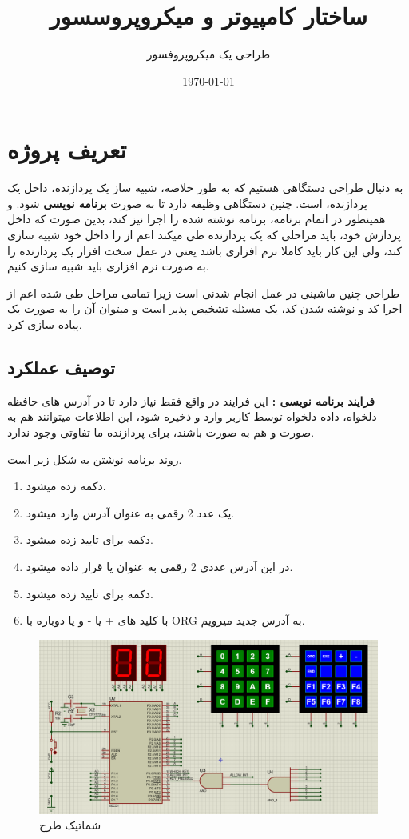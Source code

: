 \documentclass[11pt]{article}
\title{ساختار کامپیوتر و میکروپروسسور}
\subtitle{طراحی یک میکروپروفسور}
\date{\today}
\begin{document}
\maketitlepage
\maketitlestart

\section{تعریف پروژه}

به دنبال طراحی دستگاهی هستیم که به طور خلاصه، شبیه ساز یک
پردازنده، داخل یک پردازنده، است. چنین دستگاهی وظیفه دارد تا
به صورت  \textbf{برنامه نویسی} شود. و همینطور در
اتمام برنامه، برنامه نوشته شده را اجرا نیز کند، بدین صورت که داخل
پردازش خود، باید مراحلی که یک پردازنده طی میکند اعم از
 را داخل خود شبیه سازی کند، ولی این
کار باید کاملا نرم افزاری باشد یعنی در عمل سخت افزار یک پردازنده را
به صورت نرم افزاری باید شبیه سازی کنیم.

طراحی چنین ماشینی در عمل انجام شدنی است زیرا تمامی مراحل طی شده
اعم از اجرا کد و نوشته شدن کد، یک مسئله تشخیص پذیر است و میتوان آن را
به صورت یک  پیاده سازی کرد.

\subsection{توصیف عملکرد}

\textbf{فرایند برنامه نویسی : }
این فرایند در واقع فقط نیاز دارد تا در آدرس های حافظه دلخواه، داده دلخواه توسط کاربر وارد
و ذخیره شود، این اطلاعات میتوانند هم به صورت  و هم به صورت  باشند،
برای پردازنده ما تفاوتی وجود ندارد.

روند برنامه نوشتن به شکل زیر است.

\begin{enumerate}
	\item دکمه  زده میشود.
	\item یک عدد 2 رقمی به عنوان آدرس وارد میشود.
	\item دکمه  برای تایید زده میشود.
	\item در این آدرس عددی 2 رقمی به عنوان  یا  قرار داده میشود.
	\item دکمه  برای تایید زده میشود.
	\item با کلید های + یا - و یا دوباره با ORG به آدرس جدید میرویم.
\end{enumerate}

\clearpage

\begin{figure}[h]
	\centering
	\includegraphics[width=0.9\linewidth]{result/schematics.png}
	\caption{شماتیک طرح}
\end{figure}
\end{document}
